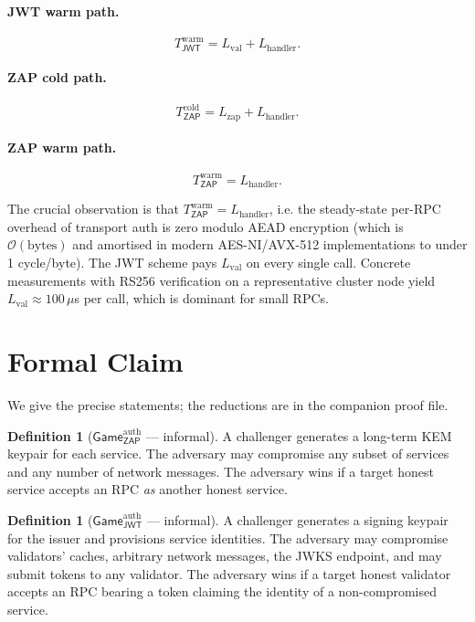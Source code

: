 \documentclass[11pt,a4paper]{article}
\theoremstyle{plain}
\theoremstyle{definition}
\newtheorem{definition}[theorem]{Definition}
\newcommand{\GameG}{\mathsf{Game}}
\newcommand{\JWT}{\mathsf{JWT}}
\newcommand{\ZAP}{\mathsf{ZAP}}
\newcommand{\bigO}{\mathcal{O}}
\begin{document}
\paragraph{JWT warm path.}
\[
T_{\JWT}^{\text{warm}} = L_{\text{val}} + L_{\text{handler}}.
\]

\paragraph{ZAP cold path.}
\[
T_{\ZAP}^{\text{cold}} = L_{\text{zap}} + L_{\text{handler}}.
\]

\paragraph{ZAP warm path.}
\[
T_{\ZAP}^{\text{warm}} = L_{\text{handler}}.
\]

The crucial observation is that $T_{\ZAP}^{\text{warm}} =
L_{\text{handler}}$, i.e. the steady-state per-RPC overhead of transport
auth is zero modulo AEAD encryption (which is $\bigO(\text{bytes})$ and
amortised in modern AES-NI/AVX-512 implementations to under 1 cycle/byte).
The JWT scheme pays $L_{\text{val}}$ on every single call. Concrete
measurements with RS256 verification on a representative cluster node
yield $L_{\text{val}} \approx 100$\,$\mu$s per call, which is dominant for
small RPCs.

\section{Formal Claim}
\label{sec:formal}

We give the precise statements; the reductions are in the companion proof
file.

\begin{definition}[$\GameG_\ZAP^{\text{auth}}$ --- informal]
A challenger generates a long-term KEM keypair for each service. The
adversary may compromise any subset of services and any number of
network messages. The adversary wins if a target honest service accepts
an RPC \emph{as} another honest service.
\end{definition}

\begin{definition}[$\GameG_\JWT^{\text{auth}}$ --- informal]
A challenger generates a signing keypair for the issuer and provisions
service identities. The adversary may compromise validators' caches,
arbitrary network messages, the JWKS endpoint, and may submit tokens to
any validator. The adversary wins if a target honest validator accepts an
RPC bearing a token claiming the identity of a non-compromised service.
\end{definition}
\end{document}
